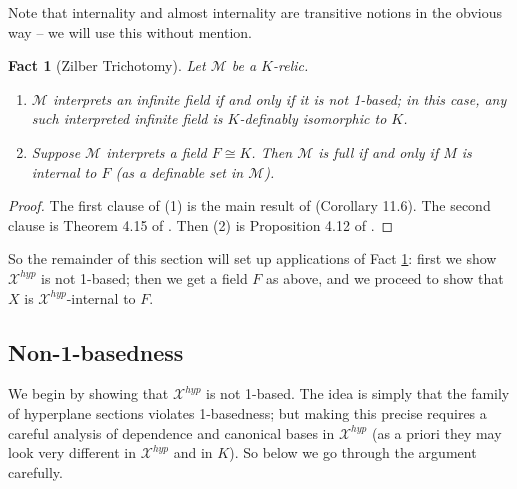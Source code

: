 \documentclass{amsart}
\newtheorem{fact}[theorem]{Fact}
\theoremstyle{definition}
\begin{document}
Note that internality and almost internality are transitive notions in the obvious way -- we will use this without mention.

\begin{fact}[Zilber Trichotomy]\label{F: trichotomy} Let $\mathcal M$ be a $K$-relic.
\begin{enumerate}
    \item $\mathcal M$ interprets an infinite field if and only if it is not 1-based; in this case, any such interpreted infinite field is $K$-definably isomorphic to $K$.
    \item Suppose $\mathcal M$ interprets a field $F\cong K$. Then $\mathcal M$ is full if and only if $M$ is internal to $F$ (as a definable set in $\mathcal M$).
\end{enumerate}
\end{fact}
\begin{proof}
    The first clause of (1) is the main result of \cite{CasHasYe} (Corollary 11.6). The second clause is Theorem 4.15 of \cite{PoiGroups}. Then (2) is Proposition 4.12 of \cite{CasHasVA}.
\end{proof}

So the remainder of this section will set up applications of Fact \ref{F: trichotomy}: first we show $\mathcal X^{hyp}$ is not 1-based; then we get a field $F$ as above, and we proceed to show that $X$ is $\mathcal X^{hyp}$-internal to $F$. 

\subsection{Non-1-basedness}

We begin by showing that $\mathcal X^{hyp}$ is not 1-based. The idea is simply that the family of hyperplane sections violates 1-basedness; but making this precise requires a careful analysis of dependence and canonical bases in $\mathcal X^{hyp}$ (as a priori they may look very different in $\mathcal X^{hyp}$ and in $K$). So below we go through the argument carefully. 
\end{document}
